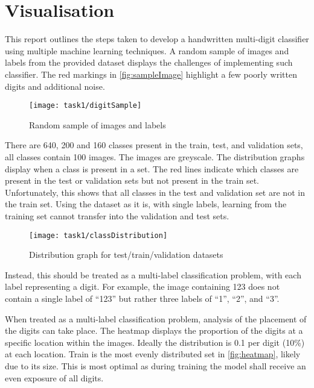 \chapter{Visualisation}
This report outlines the steps taken to develop a handwritten multi-digit classifier using multiple machine learning techniques. A random sample of images and labels from the provided dataset displays the challenges of implementing such classifier. The red markings in \autoref{fig:sampleImage} highlight a few poorly written digits and additional noise.

\begin{figure}[h]
    \centering
    \texttt{[image: task1/digitSample]}
    \caption[Random sample of images and labels]
    {Random sample of images and labels}
    \label{fig:sampleImage}
\end{figure}

There are 640, 200 and 160 classes present in the train, test, and validation sets, all classes contain 100 images.  The images are greyscale. The distribution graphs display when a class is present in a set. The red lines indicate which classes are present in the test or validation sets but not present in the train set. Unfortunately, this shows that all classes in the test and validation set are not in the train set. Using the dataset as it is, with single labels, learning from the training set cannot transfer into the validation and test sets.

\begin{figure}[h]
    \centering
    \texttt{[image: task1/classDistribution]}
    \caption[Distribution graph for datasets]
    {Distribution graph for test/train/validation datasets}
    \label{fig:classDistribution}
\end{figure}

Instead, this should be treated as a multi-label classification problem, with each label representing a digit. For example, the image containing 123 does not contain a single label of “123” but rather three labels of “1”, “2”, and “3”.

When treated as a multi-label classification problem, analysis of the placement of the digits can take place. The heatmap displays the proportion of the digits at a specific location within the images. Ideally the distribution is 0.1 per digit (10\%) at each location. Train is the most evenly distributed set in \autoref{fig:heatmap}, likely due to its size.  This is most optimal as during training the model shall receive an even exposure of all digits.

